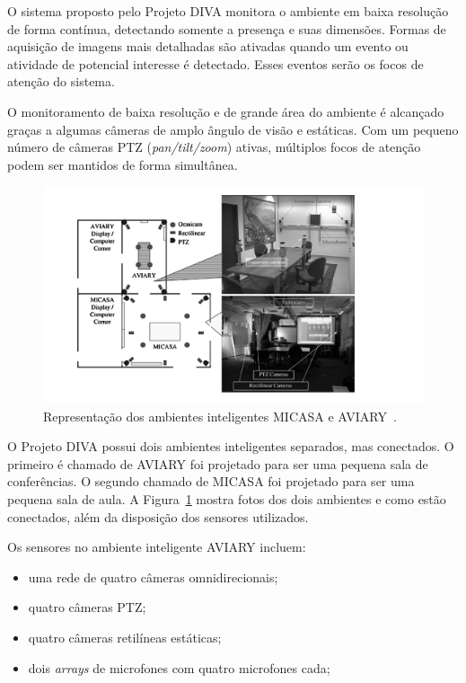 O sistema proposto pelo Projeto DIVA monitora o ambiente em baixa resolução de forma contínua, detectando somente a presença e suas dimensões. Formas de aquisição de imagens mais detalhadas são ativadas quando um evento ou atividade de potencial interesse é detectado. Esses eventos serão os focos de atenção do sistema.

O monitoramento de baixa resolução e de grande área do ambiente é alcançado graças a algumas câmeras de amplo ângulo de visão e estáticas. Com um pequeno número de câmeras PTZ (\textit{pan/tilt/zoom}) ativas, múltiplos focos de atenção podem ser mantidos de forma simultânea.

	\begin{figure}[hbt]
		\begin{center}
	\includegraphics[scale=0.5]{figuras/3.TrabalhosCorrelatos/micasa_aviary.png}
		\end{center}
		\caption{Representação dos ambientes inteligentes MICASA e AVIARY~\cite{trivedi}.}
		\label{micasa_aviary}
	\end{figure}

O Projeto DIVA possui dois ambientes inteligentes separados, mas conectados. O primeiro é chamado de AVIARY foi projetado para ser uma pequena sala de conferências. O segundo chamado de MICASA foi projetado para ser uma pequena sala de aula. A Figura~\ref{micasa_aviary} mostra fotos dos dois ambientes e como estão conectados, além da disposição dos sensores utilizados.

Os sensores no ambiente inteligente AVIARY incluem:

	\begin{itemize}
		\item uma rede de quatro câmeras omnidirecionais;
		\item quatro câmeras PTZ;
		\item quatro câmeras retilíneas estáticas;
		\item dois \textit{arrays} de microfones com quatro microfones cada;
	\end{itemize}

